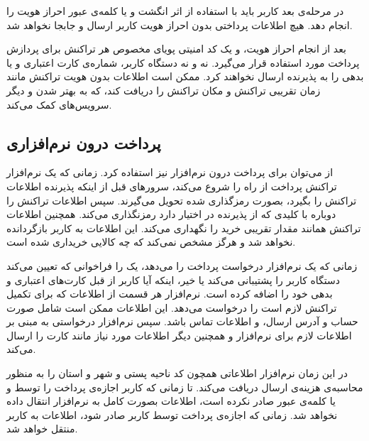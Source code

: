 \documentclass[oneside]{report}
\begin{document}
 در مرحله‌ی بعد کاربر باید با استفاده از اثر انگشت و یا کلمه‌ی عبور احراز هویت را انجام دهد. هیچ اطلاعات پرداختی بدون احراز هویت کاربر ارسال و جابجا نخواهد شد. 
 
 بعد از انجام احراز هویت،
 {\normalsize {}} 
 و یک  کد امنیتی پویای مخصوص هر تراکنش برای پردازش پرداخت مورد استفاده قرار می‌گیرد. نه 
  {\normalsize {}}
  و نه دستگاه کاربر،  شماره‌ی کارت اعتباری و یا بدهی را به پذیرنده ارسال نخواهند کرد. 
   {\normalsize {}}
   ممکن است اطلاعات بدون هویت تراکنش مانند زمان تقریبی تراکنش و مکان تراکنش را دریافت کند، که به بهتر شدن 
    {\normalsize {}} 
    و دیگر سرویس‌های 
     {\normalsize {}} 
     کمک می‌کند.  
   
   \subsection{پرداخت درون نرم‌افزاری}
از 
     {\normalsize {}}
     می‌توان برای پرداخت درون‌ نرم‌افزار نیز  استفاده کرد.  زمانی که یک نرم‌افزار  تراکنش پرداخت از راه 
      {\normalsize {}} 
      را شروع می‌کند،  سرورهای 
      {\normalsize {}}
      قبل از اینکه پذیرنده اطلاعات تراکنش را بگیرد،  بصورت رمزگذاری شده تحویل می‌گیرند. سپس 
          {\normalsize {}} 
   اطلاعات تراکنش  را دوباره با کلیدی که از پذیرنده در اختیار دارد رمزنگذاری می‌کند. 
        {\normalsize {}} 
        همچنین اطلاعات  تراکنش همانند مقدار تقریبی خرید را نگهداری می‌کند. این اطلاعات به کاربر بازگردانده نخواهد شد و هرگز مشخص نمی‌کند که چه کالایی خریداری شده‌ است. 
        
زمانی که یک نرم‌افزار درخواست پرداخت را می‌دهد،  یک 
{\normalsize {}} 
    را فراخوانی که تعیین می‌کند دستگاه کاربر 
    {\normalsize {}} 
   را پشتیبانی می‌کند یا خیر، اینکه آیا کاربر از قبل کارت‌های اعتباری و بدهی خود را اضافه کرده است.
   نرم‌افزار هر قسمت از اطلاعات که برای تکمیل  تراکنش لازم است  را درخواست می‌دهد. این اطلاعات ممکن است شامل صورت حساب و آدرس ارسال، و اطلاعات تماس باشد. سپس نرم‌افزار درخواستی به 
   {\normalsize {}} 
   مبنی بر اطلاعات لازم برای نرم‌افزار و همچنین دیگر اطلاعات مورد نیاز مانند کارت را ارسال می‌کند. 

  در این زمان نرم‌افزار اطلاعاتی همچون کد ناحیه پستی و شهر و استان را به منظور محاسبه‌ی هزینه‌ی ارسال دریافت می‌کند. تا زمانی که کاربر اجازه‌ی پرداخت را توسط 
  {\normalsize {}} 
  و یا کلمه‌ی عبور صادر نکرده است،  اطلاعات بصورت کامل به نرم‌افزار انتقال داده نخواهد شد. زمانی که اجازه‌ی 	پرداخت توسط کاربر صادر شود،  اطلاعات به کاربر منتقل خواهد شد. 
  
\end{document}

